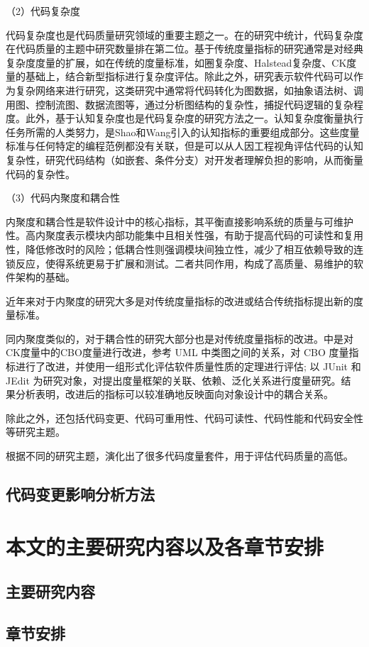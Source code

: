 （2）代码复杂度

代码复杂度也是代码质量研究领域的重要主题之一。在\cite{NUNEZVARELA2017164}的研究中统计，代码复杂度在代码质量的主题中研究数量排在第二位。基于传统度量指标的研究通常是对经典复杂度度量的扩展，如在传统的度量标准，如圈复杂度、Halstead复杂度、CK度量的基础上，结合新型指标进行复杂度评估。除此之外，研究表示软件代码可以作为复杂网络来进行研究\cite{综述中}，这类研究中通常将代码转化为图数据，如抽象语法树、调用图、控制流图、数据流图等，通过分析图结构的复杂性，捕捉代码逻辑的复杂程度。此外，基于认知复杂度也是代码复杂度的研究方法之一。认知复杂度衡量执行任务所需的人类努力\cite{综述中}，是Shao和Wang\cite{综述中}引入的认知指标的重要组成部分。这些度量标准与任何特定的编程范例都没有关联，但是可以从人因工程视角评估代码的认知复杂性，研究代码结构（如嵌套、条件分支）对开发者理解负担的影响，从而衡量代码的复杂性。


（3）代码内聚度和耦合性

内聚度和耦合性是软件设计中的核心指标，其平衡直接影响系统的质量与可维护性。高内聚度表示模块内部功能集中且相关性强，有助于提高代码的可读性和复用性，降低修改时的风险；低耦合性则强调模块间独立性，减少了相互依赖导致的连锁反应，使得系统更易于扩展和测试。二者共同作用，构成了高质量、易维护的软件架构的基础。

近年来对于内聚度的研究大多是对传统度量指标的改进或结合传统指标提出新的度量标准。




同内聚度类似的，对于耦合性的研究大部分也是对传统度量指标的改进。\cite{面向对象软件耦合度量方法}中是对CK度量中的CBO度量进行改进，参考 UML 中类图之间的关系，对 CBO 度量指标进行了改进，并使用一组形式化评估软件质量性质的定理进行评估; 以 JUnit 和 JEdit 为研究对象，对提出度量框架的关联、依赖、泛化关系进行度量研究。结 果分析表明，改进后的指标可以较准确地反映面向对象设计中的耦合关系。


除此之外，还包括代码变更、代码可重用性、代码可读性、代码性能和代码安全性等研究主题。

根据不同的研究主题，演化出了很多代码度量套件，用于评估代码质量的高低。


\subsection{代码变更影响分析方法}


\section{本文的主要研究内容以及各章节安排}
\subsection{主要研究内容}
\subsection{章节安排}


